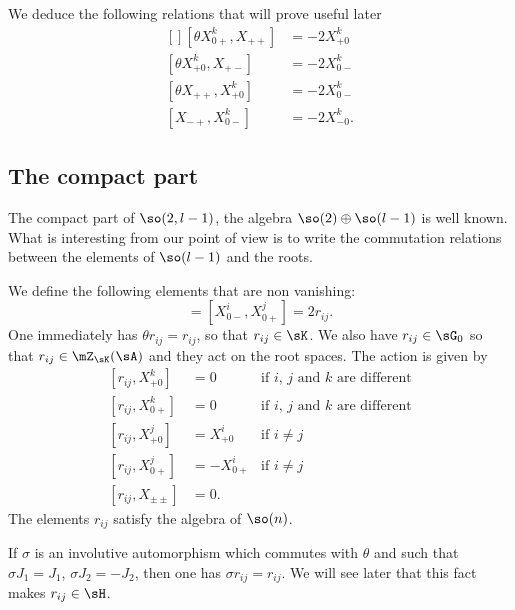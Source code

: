 We deduce the following relations that will prove useful later
\begin{equation}
	\begin{aligned}[]
		[\theta X_{0+}^k,X_{++}]&=-2X^k_{+0}\\
		[\theta X_{+0}^k,X_{+-}]&=-2X^k_{0-}\\
		[\theta X_{++},X_{+0}^k]&=-2X^k_{0-}\\
		[X_{-+},X^k_{0-}]&=-2X^k_{-0}.
	\end{aligned}
\end{equation}


%
%
\subsection{The compact part}
%
\label{LONGSubSec_Thecompactpart}

The compact part of $\so(2,l-1)$, the algebra $\so(2)\oplus\so(l-1)$ is well known. What is interesting from our point of view is to write the commutation relations between the elements of $\so(l-1)$ and the roots.

We define the following elements that are non vanishing:
\begin{equation}
	[X_{0+}^i,X_{0-}^j]=[X_{0-}^i,X_{0+}^j]=2r_{ij}.
\end{equation}
One immediately has $\theta r_{ij}=r_{ij}$, so that $r_{ij}\in\sK$. We also have $r_{ij}\in\sG_0$ so that $r_{ij}\in\mZ_{\sK}(\sA)$ and they act on the root spaces. The action is given by
\begin{subequations}
	\begin{align}		\label{LONGEqComsRRN}
		[r_{ij},X_{+0}^k]&=0		&\text{if $i$, $j$ and $k$ are different}\\
		[r_{ij},X_{0+}^k]&=0		&\text{if $i$, $j$ and $k$ are different}\\
		[r_{ij},X_{+0}^j]&=X_{+0}^i	&\text{if $i\neq j$}\\
		[r_{ij},X_{0+}^j]&=-X_{0+}^i	&\text{if $i\neq j$}\\
		[r_{ij},X_{\pm\pm}]&=0.			\label{LONGsubeqrXpmpm}
	\end{align}
\end{subequations}
The elements $r_{ij}$ satisfy the algebra of $\so(n)$.

\begin{remark}
	If $\sigma$ is an involutive automorphism which commutes with $\theta$ and such that $\sigma J_1=J_1$, $\sigma J_2=-J_2$, then one has $\sigma r_{ij}=r_{ij}$. We will see later that this fact makes $r_{ij}\in\sH$.
\end{remark}

